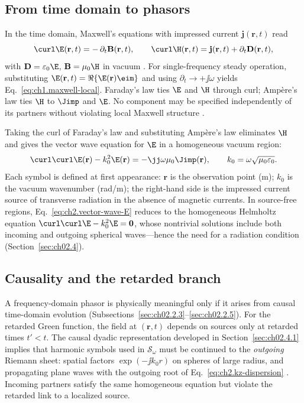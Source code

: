 \subsection{From time domain to phasors}
\label{sec:ch02.2.1}

In the time domain, Maxwell's equations with impressed current $\mathbf{j}(\mathbf{r},t)$ read
\begin{equation}
\label{eq:ch2.maxwell-td}
\curl\E(\mathbf{r},t)=-\,\partial_t\mathbf{B}(\mathbf{r},t),
\qquad
\curl\H(\mathbf{r},t)=\mathbf{j}(\mathbf{r},t)+\partial_t\mathbf{D}(\mathbf{r},t),
\end{equation}
with $\mathbf{D}=\varepsilon_0\E$, $\mathbf{B}=\mu_0\H$ in vacuum \cite{maxwell1873}. For single-frequency steady operation, substituting $\E(\mathbf{r},t)=\Re\{\E(\mathbf{r})\eim\}$ and using $\partial_t\to+\jj\omega$ yields Eq.~\eqref{eq:ch1.maxwell-local}. Faraday's law ties $\E$ and $\H$ through curl; Amp\`ere's law ties $\H$ to $\Jimp$ and $\E$. No component may be specified independently of its partners without violating local Maxwell structure \cite{stratton1941}.

Taking the curl of Faraday's law and substituting Amp\`ere's law eliminates $\H$ and gives the vector wave equation for $\E$ in a homogeneous vacuum region:
\begin{equation}
\label{eq:ch2.vector-wave-E}
\curl\curl\E(\mathbf{r})-k_0^2\E(\mathbf{r})=-\jj\omega\mu_0\Jimp(\mathbf{r}),
\qquad
k_0=\omega\sqrt{\mu_0\varepsilon_0}.
\end{equation}
Each symbol is defined at first appearance: $\mathbf{r}$ is the observation point (m); $k_0$ is the vacuum wavenumber (rad/m); the right-hand side is the impressed current source of transverse radiation in the absence of magnetic currents. In source-free regions, Eq.~\eqref{eq:ch2.vector-wave-E} reduces to the homogeneous Helmholtz equation $\curl\curl\E-k_0^2\E=\mathbf{0}$, whose nontrivial solutions include both incoming and outgoing spherical waves---hence the need for a radiation condition (Section~\ref{sec:ch02.4}).

\subsection{Causality and the retarded branch}
\label{sec:ch02.2.2}

A frequency-domain phasor is physically meaningful only if it arises from causal time-domain evolution (Subsections~\ref{sec:ch02.2.3}--\ref{sec:ch02.2.5}). For the retarded Green function, the field at $(\mathbf{r},t)$ depends on sources only at retarded times $t'<t$. The causal dyadic representation developed in Section~\ref{sec:ch02.4.1} implies that harmonic symbols used in $\mathcal{S}_\omega$ must be continued to the \emph{outgoing} Riemann sheet: spatial factors $\exp(-\jj k_0 r)$ on spheres of large radius, and propagating plane waves with the outgoing root of Eq.~\eqref{eq:ch2.kz-dispersion} \cite{stratton1941,jackson1999}. Incoming partners satisfy the same homogeneous equation but violate the retarded link to a localized source.

